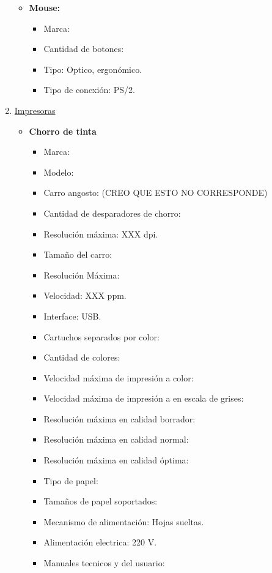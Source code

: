 \begin{enumerate}
\begin{itemize}
    \item \textbf{Mouse:}
    \begin{itemize}
      \item Marca:
      \item Cantidad de botones:
      \item Tipo: Optico, ergonómico.
      \item Tipo de conexión: PS/2.
    \end{itemize}
  \end{itemize}
  
  \item \underline{Impresoras}
  \begin{itemize}
    \item \textbf{Chorro de tinta}
    \begin{itemize}
      \item Marca:
      \item Modelo:
      \item Carro angosto: (CREO QUE ESTO NO CORRESPONDE)
      \item Cantidad de desparadores de chorro:
      
      \item Resolución máxima: XXX dpi.
      \item Tamaño del carro:
      \item Resolución Máxima:
      \item Velocidad: XXX ppm.
      \item Interface: USB.
      
      \item Cartuchos separados por color:
      \item Cantidad de colores:
      \item Velocidad máxima de impresión a color:
      \item Velocidad máxima de impresión a en escala de grises:
      \item Resolución máxima en calidad borrador:
      \item Resolución máxima en calidad normal:
      \item Resolución máxima en calidad óptima:
      
      \item Tipo de papel:
      \item Tamaños de papel soportados:
      \item Mecanismo de alimentación: Hojas sueltas.
      
      \item Alimentación electrica: 220 V.
      \item Manuales tecnicos y del usuario:
    \end{itemize}
    

\end{itemize}
\end{enumerate}
